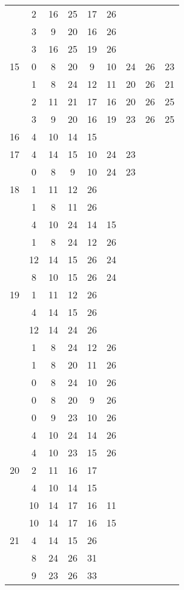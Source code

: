 \begin{table}[H]
\begin{tabular}{|c|cccccccc|}
 & 2 & 16 & 25 & 17 & 26 &   &   &  \\
 & 3 & 9 & 20 & 16 & 26 &   &   &  \\
 & 3 & 16 & 25 & 19 & 26 &   &   &  \\
\hline
15  & 0 & 8 & 20 & 9 & 10 & 24 & 26 & 23\\
 & 1 & 8 & 24 & 12 & 11 & 20 & 26 & 21\\
 & 2 & 11 & 21 & 17 & 16 & 20 & 26 & 25\\
 & 3 & 9 & 20 & 16 & 19 & 23 & 26 & 25\\
\hline
16  & 4 & 10 & 14 & 15 &   &   &   &  \\
\hline
17  & 4 & 14 & 15 & 10 & 24 & 23 &   &  \\
 & 0 & 8 & 9 & 10 & 24 & 23 &   &  \\
\hline
18  & 1 & 11 & 12 & 26 &   &   &   &  \\
 & 1 & 8 & 11 & 26 &   &   &   &  \\
 & 4 & 10 & 24 & 14 & 15 &   &   &  \\
 & 1 & 8 & 24 & 12 & 26 &   &   &  \\
 & 12 & 14 & 15 & 26 & 24 &   &   &  \\
 & 8 & 10 & 15 & 26 & 24 &   &   &  \\
\hline
19  & 1 & 11 & 12 & 26 &   &   &   &  \\
 & 4 & 14 & 15 & 26 &   &   &   &  \\
 & 12 & 14 & 24 & 26 &   &   &   &  \\
 & 1 & 8 & 24 & 12 & 26 &   &   &  \\
 & 1 & 8 & 20 & 11 & 26 &   &   &  \\
 & 0 & 8 & 24 & 10 & 26 &   &   &  \\
 & 0 & 8 & 20 & 9 & 26 &   &   &  \\
 & 0 & 9 & 23 & 10 & 26 &   &   &  \\
 & 4 & 10 & 24 & 14 & 26 &   &   &  \\
 & 4 & 10 & 23 & 15 & 26 &   &   &  \\
\hline
20  & 2 & 11 & 16 & 17 &   &   &   &  \\
 & 4 & 10 & 14 & 15 &   &   &   &  \\
 & 10 & 14 & 17 & 16 & 11 &   &   &  \\
 & 10 & 14 & 17 & 16 & 15 &   &   &  \\
\hline
21  & 4 & 14 & 15 & 26 &   &   &   &  \\
 & 8 & 24 & 26 & 31 &   &   &   &  \\
 & 9 & 23 & 26 & 33 &   &   &   &  \\

\end{tabular}
\end{table}
